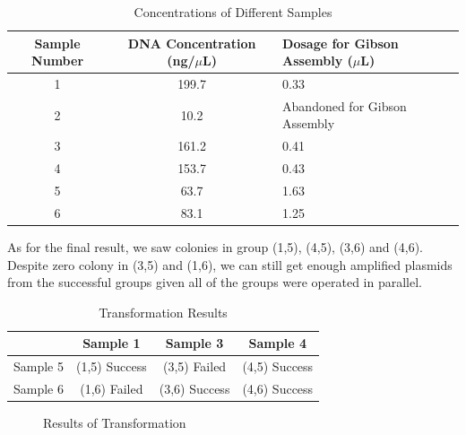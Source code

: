 \documentclass{article}
\begin{document}
\begin{table}
    \centering
    \begin{tabular}{|c|c|l|} \hline 
         Sample Number& DNA Concentration (ng/$\mu$L) &Dosage for Gibson Assembly ($\mu$L)\\ \hline 
         1& 199.7 &0.33\\ \hline 
         2& 10.2 &Abandoned for Gibson Assembly\\ \hline 
         3& 161.2 &0.41\\ \hline 
         4& 153.7 &0.43\\ \hline 
         5& 63.7 &1.63\\ \hline 
         6& 83.1 &1.25\\ \hline
    \end{tabular}
    \caption{Concentrations of Different Samples}
    \label{Concentrations of Different Samples}
\end{table}
As for the final result, we saw colonies in group (1,5), (4,5), (3,6) and (4,6). Despite zero colony in (3,5) and (1,6), we can still get enough amplified plasmids from the successful groups given all of the groups were operated in parallel. 
\begin{table}
    \centering
    \begin{tabular}{|c|c|c|c|} \hline 
         &  Sample 1&  Sample 3& Sample 4\\ \hline 
         Sample 5&  (1,5) Success&  (3,5) Failed& (4,5) Success\\ \hline 
         Sample 6&  (1,6) Failed&  (3,6) Success& (4,6) Success\\ \hline
    \end{tabular}
    \caption{Transformation Results}
    \label{Transformation Results}
\end{table}
\begin{figure}
    \centering
    
    \caption{Results of Transformation}
    \label{Results of Transformation}
\end{figure}




\end{document}
